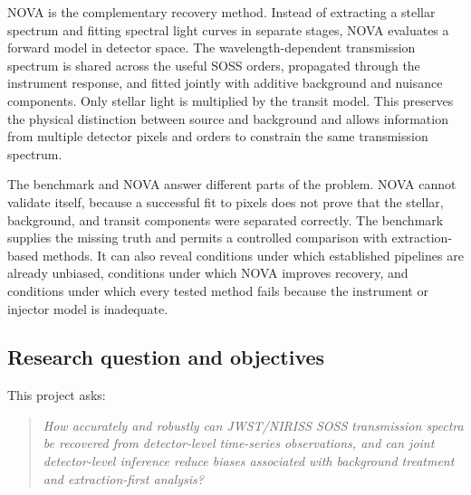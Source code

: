 NOVA is the complementary recovery method. Instead of extracting a stellar
spectrum and fitting spectral light curves in separate stages, NOVA evaluates a
forward model in detector space. The wavelength-dependent transmission spectrum
is shared across the useful SOSS orders, propagated through the instrument
response, and fitted jointly with additive background and nuisance components.
Only stellar light is multiplied by the transit model. This preserves the
physical distinction between source and background and allows information from
multiple detector pixels and orders to constrain the same transmission
spectrum.


The benchmark and NOVA answer different parts of the problem. NOVA cannot
validate itself, because a successful fit to pixels does not prove that the
stellar, background, and transit components were separated correctly. The
benchmark supplies the missing truth and permits a controlled comparison with
extraction-based methods. It can also reveal conditions under which established
pipelines are already unbiased, conditions under which NOVA improves recovery,
and conditions under which every tested method fails because the instrument or
injector model is inadequate.

\subsection{Research question and objectives}
\label{sec:research-question}


This project asks:
\begin{quote}
\raggedright\itshape
How accurately and robustly can JWST/NIRISS SOSS transmission spectra
be recovered from detector-level time-series observations, and can joint
detector-level inference reduce biases associated with background treatment and
extraction-first analysis?
\end{quote}

